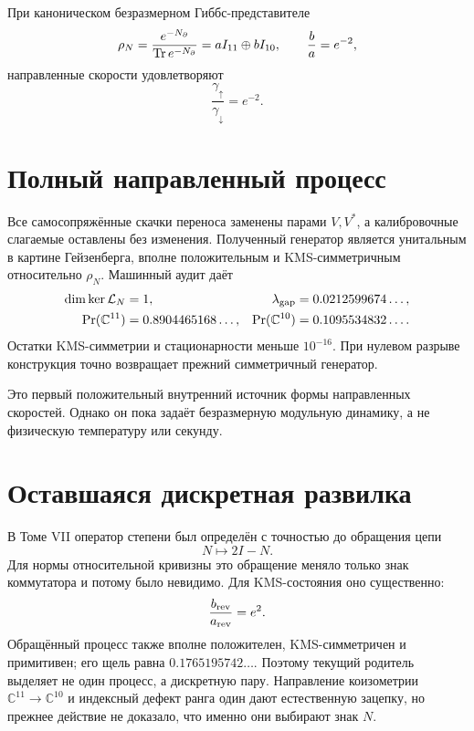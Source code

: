При каноническом безразмерном Гиббс-представителе
\begin{equation}
 \rho_N=\frac{e^{-N_{\partial}}}{\operatorname{Tr} e^{-N_{\partial}}}
 =aI_{11}\oplus bI_{10},
 \qquad
 \frac ba=e^{-2},
 \label{eq:v8-chain-number-gibbs-state}
\end{equation}
направленные скорости удовлетворяют
\begin{equation}
 \frac{\gamma_\uparrow}{\gamma_\downarrow}=e^{-2}.
 \label{eq:v8-chain-number-rate-ratio}
\end{equation}

\section{Полный направленный процесс}

Все самосопряжённые скачки переноса заменены парами $V,V^*$, а калибровочные
слагаемые оставлены без изменения. Полученный генератор является
унитальным в картине Гейзенберга, вполне положительным и KMS-симметричным
относительно $\rho_N$. Машинный аудит даёт
\begin{align}
 \dim\ker\mathcal L_N&=1,
 &\lambda_{\rm gap}&=0.0212599674\ldots,\nonumber\\
 \Pr(\mathbb C^{11})&=0.8904465168\ldots,
 &\Pr(\mathbb C^{10})&=0.1095534832\ldots.
 \label{eq:v8-chain-number-forward-process}
\end{align}
Остатки KMS-симметрии и стационарности меньше $10^{-16}$. При нулевом
разрыве конструкция точно возвращает прежний симметричный генератор.

Это первый положительный внутренний источник формы направленных скоростей.
Однако он пока задаёт безразмерную модульную динамику, а не физическую
температуру или секунду.

\section{Оставшаяся дискретная развилка}

В Томе VII оператор степени был определён с точностью до обращения цепи
\begin{equation}
 N\longmapsto2I-N.
 \label{eq:v8-chain-number-reversal}
\end{equation}
Для нормы относительной кривизны это обращение меняло только знак коммутатора и
потому было невидимо. Для KMS-состояния оно существенно:
\begin{equation}
 \frac{b_{\rm rev}}{a_{\rm rev}}=e^2.
\end{equation}
Обращённый процесс также вполне положителен, KMS-симметричен и примитивен;
его щель равна $0.1765195742\ldots$. Поэтому текущий родитель выделяет не
один процесс, а дискретную пару. Направление коизометрии
$\mathbb C^{11}\to\mathbb C^{10}$ и индексный дефект ранга один дают
естественную зацепку, но прежнее действие не доказало, что именно они
выбирают знак $N$.

